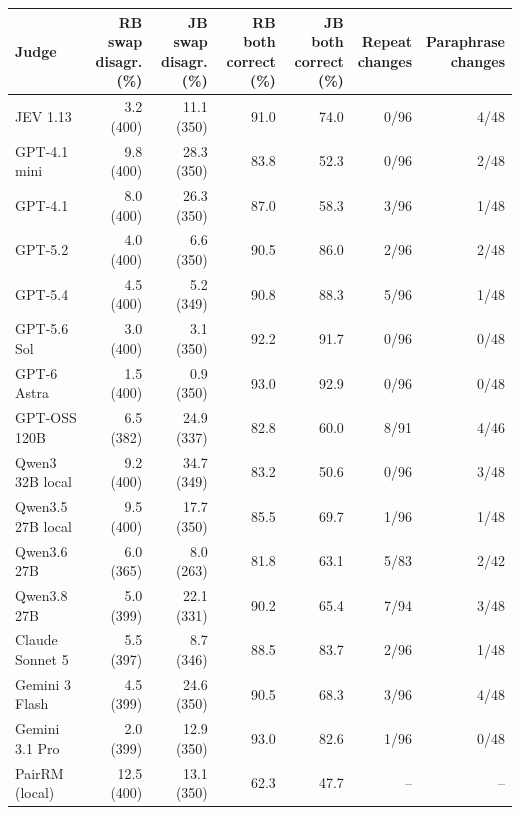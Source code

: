 \begin{tabular}{@{}lrrrrrr@{}}
\toprule
Judge & \shortstack{RB swap\\disagr. (\%)} & \shortstack{JB swap\\disagr. (\%)} & \shortstack{RB both\\correct (\%)} & \shortstack{JB both\\correct (\%)} & \shortstack{Repeat\\changes} & \shortstack{Paraphrase\\changes} \\
\midrule
JEV 1.13 & 3.2 (400) & 11.1 (350) & 91.0 & 74.0 & 0/96 & 4/48 \\
GPT-4.1 mini & 9.8 (400) & 28.3 (350) & 83.8 & 52.3 & 0/96 & 2/48 \\
GPT-4.1 & 8.0 (400) & 26.3 (350) & 87.0 & 58.3 & 3/96 & 1/48 \\
GPT-5.2 & 4.0 (400) & 6.6 (350) & 90.5 & 86.0 & 2/96 & 2/48 \\
GPT-5.4 & 4.5 (400) & 5.2 (349) & 90.8 & 88.3 & 5/96 & 1/48 \\
GPT-5.6 Sol & 3.0 (400) & 3.1 (350) & 92.2 & 91.7 & 0/96 & 0/48 \\
GPT-6 Astra & 1.5 (400) & 0.9 (350) & 93.0 & 92.9 & 0/96 & 0/48 \\
GPT-OSS 120B & 6.5 (382) & 24.9 (337) & 82.8 & 60.0 & 8/91 & 4/46 \\
Qwen3 32B local & 9.2 (400) & 34.7 (349) & 83.2 & 50.6 & 0/96 & 3/48 \\
Qwen3.5 27B local & 9.5 (400) & 17.7 (350) & 85.5 & 69.7 & 1/96 & 1/48 \\
Qwen3.6 27B & 6.0 (365) & 8.0 (263) & 81.8 & 63.1 & 5/83 & 2/42 \\
Qwen3.8 27B & 5.0 (399) & 22.1 (331) & 90.2 & 65.4 & 7/94 & 3/48 \\
Claude Sonnet 5 & 5.5 (397) & 8.7 (346) & 88.5 & 83.7 & 2/96 & 1/48 \\
Gemini 3 Flash & 4.5 (399) & 24.6 (350) & 90.5 & 68.3 & 3/96 & 4/48 \\
Gemini 3.1 Pro & 2.0 (399) & 12.9 (350) & 93.0 & 82.6 & 1/96 & 0/48 \\
PairRM (local) & 12.5 (400) & 13.1 (350) & 62.3 & 47.7 & -- & -- \\
\bottomrule
\end{tabular}
